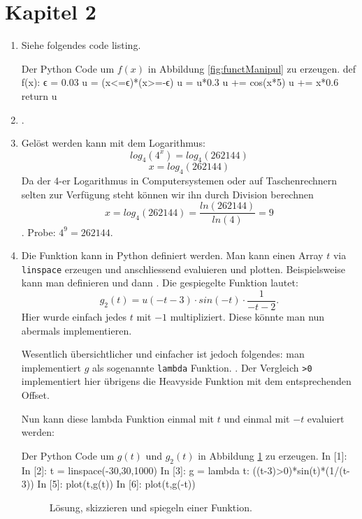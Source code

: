 \section{Kapitel 2}
\begin{enumerate}
\item Siehe folgendes code listing.
\begin{python}{Der Python Code um $f(x)$ in Abbildung \ref{fig:functManipul} zu erzeugen.}
def f(x):
    ϵ = 0.03
    u = (x<=ϵ)*(x>=-ϵ)
    u = u*0.3
    u += cos(x*5)
    u += x*0.6
    return u

\end{python}
\item {}.

\item Gelöst werden kann mit dem Logarithmus:
$$ log_4(4^x) = log_4(262144)$$
 $$ x = log_4(262144)$$
 Da der 4-er Logarithmus in Computersystemen oder auf Taschenrechnern selten zur Verfügung steht können wir ihn durch Division berechnen  
 $$ x = log_4(262144) = \frac{ln(262144)}{ln(4)} = 9$$.
 Probe: $4^9 = 262144$.

\item Die Funktion kann in Python definiert werden. Man kann einen Array $t$ via \texttt{linspace} erzeugen und anschliessend evaluieren und plotten. Beispielsweise kann man  definieren und dann . Die gespiegelte Funktion lautet:
  $$g_2(t) = u(-t-3) \cdot sin(-t) \cdot \frac{1}{-t-2}.$$
Hier wurde einfach jedes $t$ mit $-1$ multipliziert. Diese könnte man nun abermals implementieren.

Wesentlich übersichtlicher und einfacher ist jedoch folgendes: man implementiert $g$ als sogenannte \texttt{lambda} Funktion.
 . Der Vergleich \texttt{>0} implementiert hier übrigens die Heavyside Funktion mit dem entsprechenden Offset. 

Nun kann diese lambda Funktion einmal mit $t$ und einmal mit $-t$ evaluiert werden:

\begin{python}{Der Python Code um $g(t)$ und $g_2(t)$ in Abbildung \ref{fig:Loes_g1g2} zu erzeugen.}
In [1]: %
In [2]: t = linspace(-30,30,1000)
In [3]: g = lambda t: ((t-3)>0)*sin(t)*(1/(t-3))
In [5]: plot(t,g(t))
In [6]: plot(t,g(-t))
\end{python}


\begin{figure}[H]
    \centering
    
    \caption{Lösung, skizzieren und spiegeln einer Funktion.}
    \label{fig:Loes_g1g2}
\end{figure}



\end{enumerate}
